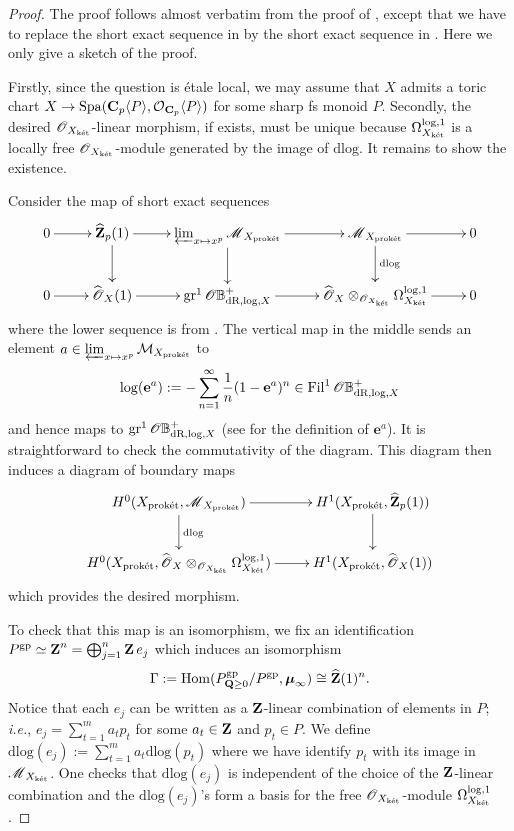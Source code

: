 \begin{proof}
The proof follows almost verbatim from the proof of \cite[Lemma 3.24]{Scholze-perfectoid-survey}, except that we have to replace the short exact sequence in \cite[Corollary 6.14]{Scholze_2013} by the short exact sequence in \cite[Corollary 2.4.5]{Diao-Lan-Liu-Zhu}. Here we only give a sketch of the proof.

Firstly, since the question is \'etale local, we may assume that $X$ admits a toric chart $X\rightarrow \operatorname{Spa}(\operatorname{\mathbf{C}}_p\langle P\rangle, \operatorname{\mathcal{O}}_{\operatorname{\mathbf{C}}_p}\langle P\rangle)$ for some sharp fs monoid $P$. Secondly, the desired $\operatorname{\mathscr{O}}_{X_{\operatorname{\textrm{k\'{e}t}}}}$-linear morphism, if exists, must be unique because $\Omega^{\log, 1}_{X_{\operatorname{\textrm{k\'{e}t}}}}$ is a locally free $\operatorname{\mathscr{O}}_{X_{\operatorname{\textrm{k\'{e}t}}}}$-module generated by the image of $\textrm{dlog}$. It remains to show the existence.

Consider the map of short exact sequences
 \[
        \xymatrix{ 0 \ar^-{}[r] & {\widehat{\Z}_p(1)} \ar^-{}[r] \ar^{}[d] & {\varprojlim_{x\mapsto x^p}\scrM_{X_{\proket}}} \ar^-{}[r] \ar^-{}[d] & {\scrM_{X_{\proket}}}  \ar^-{}[r] \ar^-{\textrm{dlog}}[d] & 0 \\
        0 \ar^-{}[r] & {\widehat{\scrO}_{X}(1)} \ar^-{}[r]  & {\textrm{gr}^1 \scrO\!\mathbb{B}^+_{\textrm{dR}, \log,X}} \ar^-{}[r] & {\widehat{\scrO}_{X}\otimes_{\scrO_{X_{\ket}}} \Omega_{X_{\ket}}^{\log, 1}}  \ar^-{}[r]  & 0 }
    \]
    where the lower sequence is from \cite[Corollary 2.4.5]{Diao-Lan-Liu-Zhu}. The vertical map in the middle sends an element $a\in \varprojlim_{x\mapsto x^p}\operatorname{\mathcal{M}}_{X_{\operatorname{\textrm{prok\'{e}t}}}}$ to 
\[\log(\mathbf{e}^a):=-\sum_{n=1}^{\infty}\frac{1}{n}(1-\mathbf{e}^a)^n\in \textrm{Fil}^1\operatorname{\mathscr{O}}\!\mathbb{B}^+_{\textrm{dR}, \log,X}\] and hence maps to $\textrm{gr}^1 \operatorname{\mathscr{O}}\!\mathbb{B}^+_{\textrm{dR}, \log,X}$ (see \cite[\S 2.2]{Diao-Lan-Liu-Zhu} for the definition of $\mathbf{e}^a$). It is straightforward to check the commutativity of the diagram. This diagram then induces a diagram of boundary maps
  \[
        \xymatrix{{H^0(X_{\proket}, \scrM_{X_{\proket}})} \ar^-{}[r] \ar^{\textrm{dlog}}[d] & {H^1(X_{\proket}, \widehat{\Z}_p(1))} \ar^-{}[d] \\
        {H^0(X_{\proket}, \widehat{\scrO}_{X}\otimes_{\scrO_{X_{\ket}}} \Omega_{X_{\ket}}^{\log, 1})} \ar^-{}[r] & {H^1(X_{\proket}, \widehat{\scrO}_{X}(1))} }
    \]
    which provides the desired morphism. 
    
    To check that this map is an isomorphism, we fix an identification $P^{\mathrm{gp}}\simeq \operatorname{\mathbf{Z}} ^n=\bigoplus_{j=1}^n \operatorname{\mathbf{Z}} e_j$ which induces an isomorphism
 $$\Gamma:=\operatorname{Hom}(P^{\mathrm{gp}}_{\operatorname{\mathbf{Q}}\geq 0}/P^{\mathrm{gp}}, \boldsymbol{\mu}_{\infty})\cong \widehat{\operatorname{\mathbf{Z}}}(1)^n.$$ 
Notice that each $e_j$ can be written as a $\operatorname{\mathbf{Z}}$-linear combination of elements in $P$; \emph{i.e.}, $e_j=\sum_{t=1}^m a_t p_t$ for some $a_t\in \operatorname{\mathbf{Z}}$ and $p_t\in P$. We define $\mathrm{dlog}(e_j):=\sum_{t=1}^m a_t\mathrm{dlog}(p_t)$ where we have identify $p_t$ with its image in $\operatorname{\mathscr{M}}_{X_{\operatorname{\textrm{k\'{e}t}}}}$. One checks that $\mathrm{dlog}(e_j)$ is independent of the choice of the $\operatorname{\mathbf{Z}}$-linear combination and the $\mathrm{dlog}(e_j)$'s form a basis for the free $\operatorname{\mathscr{O}}_{X_{\operatorname{\textrm{k\'{e}t}}}}$-module $\Omega^{\log, 1}_{X_{\operatorname{\textrm{k\'{e}t}}}}$.
 

\end{proof}
